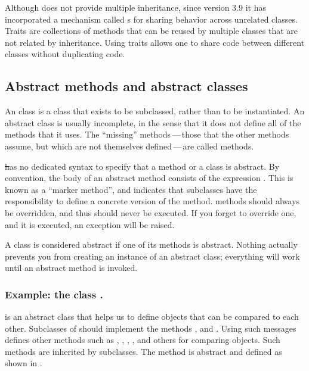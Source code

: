 \documentclass[a4paper,10pt,twoside]{book}
\begin{document}

Although \squeak does not provide multiple inheritance, since version 3.9 it has incorporated a mechanism called s for sharing behavior across unrelated classes.
Traits are collections of methods that can be reused by multiple classes that are not related by inheritance. Using traits allows one to share code between different classes without duplicating code.

\subsection{Abstract methods and abstract classes}

An  class is a class that exists to be subclassed, rather than to be instantiated.
An abstract class is usually incomplete, in the sense that it does not define all of the methods that it uses.
The ``missing'' methods\,---\,those that the other methods assume, but which are not themselves defined\,---\,are called  methods.

\st has no dedicated syntax to specify that a method or a class is abstract. 
By convention, the body of an abstract method consists of the expression \mbox{.} 
This is known as a ``marker method'', and indicates that subclasses have the responsibility to define a concrete version of the method. 
 methods should always be overridden, and thus should never be executed.
If you forget to override one, and it is executed, an exception will be raised. 

A class is considered abstract if one of its methods is abstract.
Nothing actually prevents you from creating an instance of an abstract class; everything will work until an abstract method is invoked. 

\subsubsection{Example: the class .}
 is an abstract class that helps us to  define objects that can be compared to each other. Subclasses of  should implement the methods \ct{<}, \ct{=} and . Using such messages  defines other methods such as \ct{>}, \ct{>=}, \ct{<=}, ,   and others for comparing objects. Such methods are inherited by subclasses. The method  is abstract and defined as shown in .
\end{document}
